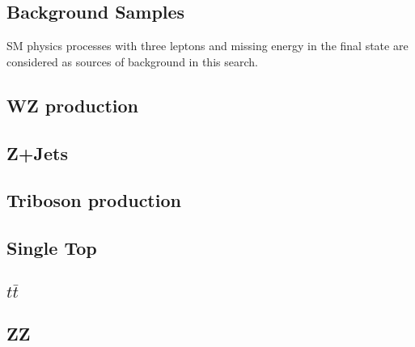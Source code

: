 \subsection{Background Samples}

SM physics processes with three leptons and missing energy in the final state
are considered as sources of background in this search.

\subsection{WZ production}

\subsection{Z+Jets}

\subsection{Triboson production}

\subsection{Single Top}

\subsection{$t\bar{t}$}

\subsection{ZZ}

